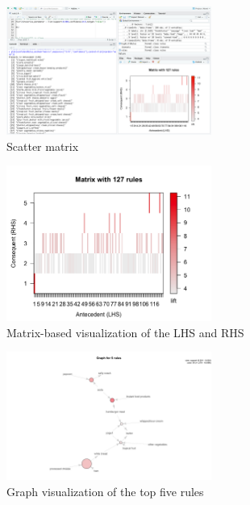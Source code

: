 \documentclass{article}
\begin{document}
\begin{figure}[H]
  \centering
  \caption{Scatter matrix}
  \includegraphics[width=0.6\textwidth]{Fig4}
\end{figure}

\begin{figure}[H]
  \centering
  \caption{Matrix-based visualization of the LHS and RHS}
  \includegraphics[width=0.6\textwidth]{Fig2}
\end{figure}

\begin{figure}[H]
  \centering
  \caption{Graph visualization of the top five rules}
  \includegraphics[width=0.6\textwidth]{Fig3}
\end{figure}
\end{document}
